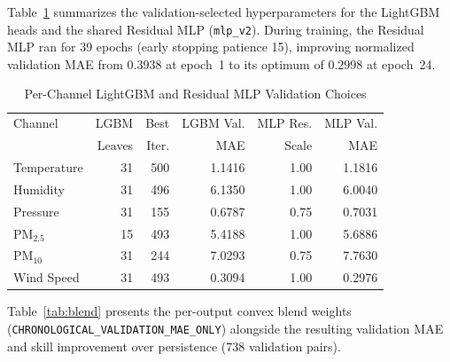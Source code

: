 \documentclass[journal,a4paper]{IEEEtran}
\begin{document}
Table~\ref{tab:lgbm_mlp} summarizes the validation-selected hyperparameters for the LightGBM heads and the shared Residual MLP (\texttt{mlp\_v2}). During training, the Residual MLP ran for 39 epochs (early stopping patience 15), improving normalized validation MAE from $0.3938$ at epoch~1 to its optimum of $0.2998$ at epoch~24.

\begin{table}[!htbp]
\caption{Per-Channel LightGBM and Residual MLP Validation Choices}
\label{tab:lgbm_mlp}
\centering
\footnotesize
\setlength{\tabcolsep}{3.5pt}
\begin{tabular}{@{}lrrrrr@{}}
\toprule
Channel & LGBM & Best & LGBM Val. & MLP Res. & MLP Val. \\
        & Leaves & Iter. & MAE & Scale & MAE \\
\midrule
Temperature & 31 & 500 & 1.1416 & 1.00 & 1.1816 \\
Humidity    & 31 & 496 & 6.1350 & 1.00 & 6.0040 \\
Pressure    & 31 & 155 & 0.6787 & 0.75 & 0.7031 \\
PM$_{2.5}$  & 15 & 493 & 5.4188 & 1.00 & 5.6886 \\
PM$_{10}$   & 31 & 244 & 7.0293 & 0.75 & 7.7630 \\
Wind Speed  & 31 & 493 & 0.3094 & 1.00 & 0.2976 \\
\bottomrule
\end{tabular}
\end{table}

Table~\ref{tab:blend} presents the per-output convex blend weights (\texttt{CHRONOLOGICAL\_VALIDATION\_MAE\_ONLY}) alongside the resulting validation MAE and skill improvement over persistence (738 validation pairs).
\end{document}
